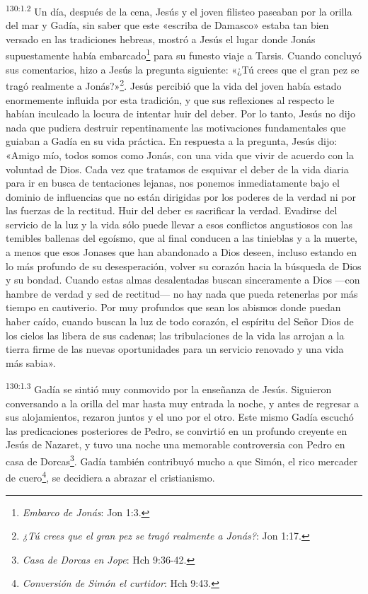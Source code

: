 \par 
\textsuperscript{130:1.2} Un día, después de la cena, Jesús y el joven filisteo paseaban por la orilla del mar y Gadía, sin saber que este «escriba de Damasco» estaba tan bien versado en las tradiciones hebreas, mostró a Jesús el lugar donde Jonás supuestamente había embarcado\footnote{\textit{Embarco de Jonás}: Jon 1:3.} para su funesto viaje a Tarsis. Cuando concluyó sus comentarios, hizo a Jesús la pregunta siguiente: «¿Tú crees que el gran pez se tragó realmente a Jonás?»\footnote{\textit{¿Tú crees que el gran pez se tragó realmente a Jonás?}: Jon 1:17.}. Jesús percibió que la vida del joven había estado enormemente influida por esta tradición, y que sus reflexiones al respecto le habían inculcado la locura de intentar huir del deber. Por lo tanto, Jesús no dijo nada que pudiera destruir repentinamente las motivaciones fundamentales que guiaban a Gadía en su vida práctica. En respuesta a la pregunta, Jesús dijo: «Amigo mío, todos somos como Jonás, con una vida que vivir de acuerdo con la voluntad de Dios. Cada vez que tratamos de esquivar el deber de la vida diaria para ir en busca de tentaciones lejanas, nos ponemos inmediatamente bajo el dominio de influencias que no están dirigidas por los poderes de la verdad ni por las fuerzas de la rectitud. Huir del deber es sacrificar la verdad. Evadirse del servicio de la luz y la vida sólo puede llevar a esos conflictos angustiosos con las temibles ballenas del egoísmo, que al final conducen a las tinieblas y a la muerte, a menos que esos Jonases que han abandonado a Dios deseen, incluso estando en lo más profundo de su desesperación, volver su corazón hacia la búsqueda de Dios y su bondad. Cuando estas almas desalentadas buscan sinceramente a Dios ---con hambre de verdad y sed de rectitud--- no hay nada que pueda retenerlas por más tiempo en cautiverio. Por muy profundos que sean los abismos donde puedan haber caído, cuando buscan la luz de todo corazón, el espíritu del Señor Dios de los cielos las libera de sus cadenas; las tribulaciones de la vida las arrojan a la tierra firme de las nuevas oportunidades para un servicio renovado y una vida más sabia».

\par 
\textsuperscript{130:1.3} Gadía se sintió muy conmovido por la enseñanza de Jesús. Siguieron conversando a la orilla del mar hasta muy entrada la noche, y antes de regresar a sus alojamientos, rezaron juntos y el uno por el otro. Este mismo Gadía escuchó las predicaciones posteriores de Pedro, se convirtió en un profundo creyente en Jesús de Nazaret, y tuvo una noche una memorable controversia con Pedro en casa de Dorcas\footnote{\textit{Casa de Dorcas en Jope}: Hch 9:36-42.}. Gadía también contribuyó mucho a que Simón, el rico mercader de cuero\footnote{\textit{Conversión de Simón el curtidor}: Hch 9:43.}, se decidiera a abrazar el cristianismo.

